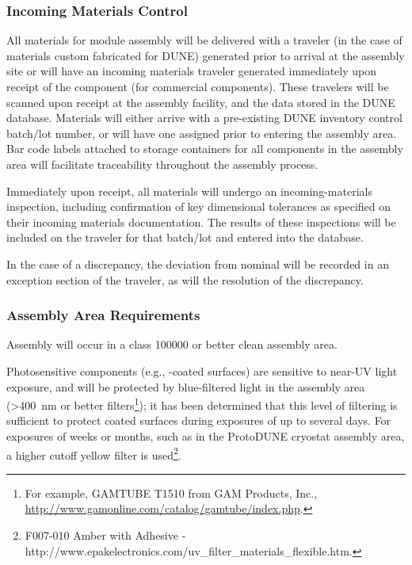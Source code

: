 \subsubsection{Incoming Materials Control}

All materials for  module assembly will be delivered with a  traveler (in the case of materials custom fabricated for DUNE) generated prior to arrival at the assembly site or will have an incoming materials traveler generated immediately upon receipt of the component (for commercial components).  These travelers will be scanned upon receipt at the assembly facility, and the data stored in the DUNE  database.  Materials will either arrive with a pre-existing DUNE inventory control batch/lot number, or will have one assigned prior to entering the assembly area.  Bar code labels attached to storage containers for all components in the assembly area will facilitate traceability throughout the assembly process.

Immediately upon receipt, all materials will undergo an incoming-materials inspection, including confirmation of key dimensional tolerances as specified on their incoming materials documentation. %
The results of these inspections will be included on the traveler for that batch/lot and entered into the database.

In the case of a discrepancy, the deviation from nominal will be recorded in an exception section of the traveler, as will the resolution of the discrepancy.

\subsubsection{Assembly Area Requirements}

Assembly will occur in a class \num{100000} or better clean assembly area.  

Photosensitive components (e.g., -coated surfaces) are sensitive to near-UV light exposure, and will be protected by blue-filtered light in the assembly area (>\SI{400}{nm} or better filters\footnote{For example, GAMTUBE T1510\texttrademark{} from GAM Products, Inc., \url{http://www.gamonline.com/catalog/gamtube/index.php}.}); it has been determined that this level of filtering is sufficient to protect coated surfaces during  exposures of up to several days. For exposures of weeks or months, such as in the ProtoDUNE cryostat assembly area, a higher cutoff yellow filter is used\footnote{F007-010\texttrademark{} Amber with Adhesive - http://www.epakelectronics.com/uv\_filter\_materials\_flexible.htm.}. 


